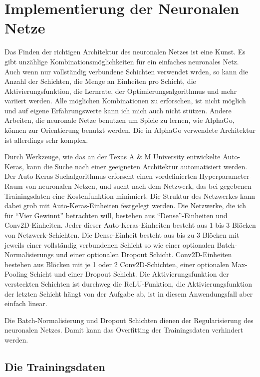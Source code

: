 \section{Implementierung der Neuronalen Netze}
\label{chap:nn-impl}

Das Finden der richtigen Architektur des neuronalen Netzes ist eine Kunst.
Es gibt unzählige Kombinationsmöglichkeiten für ein einfaches neuronales Netz.
Auch wenn nur vollständig verbundene Schichten verwendet wrden, so kann die Anzahl der Schichten, die Menge an Einheiten pro Schicht, die Aktivierungsfunktion, die Lernrate, der Optimierungsalgorithmus und mehr variiert werden.
Alle möglichen Kombinationen zu erforschen, ist nicht möglich und auf eigene Erfahrungswerte kann ich mich auch nicht stützen.
Andere Arbeiten, die neuronale Netze benutzen um Spiele zu lernen, wie AlphaGo, können zur Orientierung benutzt werden.
Die in AlphaGo verwendete Architektur ist allerdings sehr komplex.

Durch Werkzeuge, wie das an der Texas A \& M University entwickelte Auto-Keras, kann die Suche nach einer geeigneten Architektur automatisiert werden.
Der Auto-Keras Suchalgorithmus erforscht einen vordefinierten Hyperparameter-Raum von neuronalen Netzen, und sucht nach dem Netzwerk, das bei gegebenen Trainingsdaten eine Kostenfunktion minimiert.
Die Struktur des Netzwerkes kann dabei grob mit Auto-Keras-Einheiten festgelegt werden.
Die Netzwerke, die ich für ``Vier Gewinnt'' betrachten will, bestehen aus ``Dense''-Einheiten und Conv2D-Einheiten.
Jeder dieser Auto-Keras-Einheiten besteht aus 1 bis 3 Blöcken von Netzwerk-Schichten.
Die Dense-Einheit besteht aus bis zu 3 Blöcken mit jeweils einer vollständig verbundenen Schicht so wie einer optionalen Batch-Normalisierungs und einer optionalen Dropout Schicht.
Conv2D-Einheiten bestehen aus Blöcken mit je 1 oder 2 Conv2D-Schichten, einer optionalen Max-Pooling Schicht und einer Dropout Schicht.
Die Aktivierungsfunktion der versteckten Schichten ist durchweg die ReLU-Funktion, die Aktivierungsfunktion der letzten Schicht hängt von der Aufgabe ab, ist in diesem Anwendungsfall aber einfach linear.

Die Batch-Normalisierung und Dropout Schichten dienen der Regularisierung des neuronalen Netzes.
Damit kann das Overfitting der Trainingsdaten verhindert werden.


\subsection{Die Trainingsdaten}

